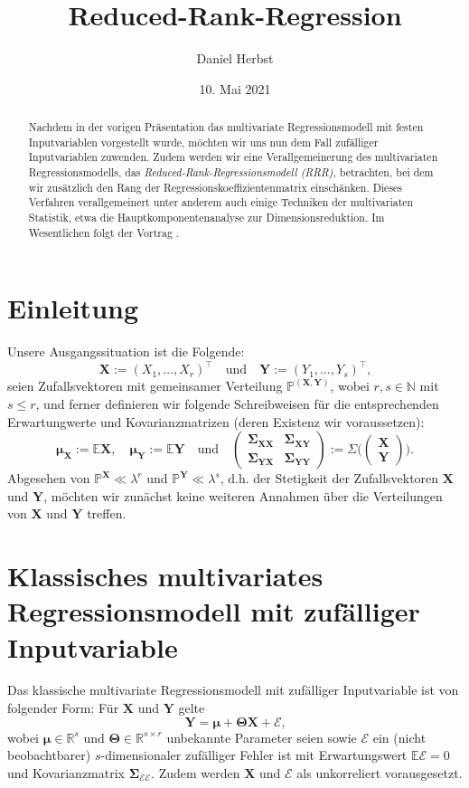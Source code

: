 \documentclass[]{article}
\title{Reduced-Rank-Regression}
\author{Daniel Herbst}
\date{10. Mai 2021}
\newcommand{\Pb}{\mathbb{P}}
\newcommand{\E}{\mathbb{E}}
\newcommand{\R}{\mathbb{R}}
\newcommand{\N}{\mathbb{N}}
\newcommand{\X}{\mathbf{X}}
\newcommand{\Y}{\mathbf{Y}}
\newcommand{\T}{\mathbf{\Theta}}
\newcommand{\muu}{\bm{\mu}}
\newcommand{\Ssigma}{\mathbf{\Sigma}}
\begin{document}
\maketitle

\begin{abstract}
Nachdem in der vorigen Präsentation das multivariate Regressionsmodell mit festen Inputvariablen vorgestellt wurde, möchten wir uns nun dem Fall zufälliger Inputvariablen zuwenden. Zudem werden wir eine Verallgemeinerung des multivariaten Regressionsmodells, das
\textit{Reduced-Rank-Regressionsmodell (RRR)}, betrachten, bei dem wir zusätzlich den Rang der Regressionskoeffizientenmatrix einschänken. Dieses Verfahren verallgemeinert unter anderem auch einige Techniken der multivariaten Statistik, etwa die Hauptkomponentenanalyse zur Dimensionsreduktion. Im Wesentlichen folgt der Vortrag 
\cite[Kapitel 6.3]{Iz08}.
\end{abstract}

\section{Einleitung}
\label{Einleitung}
Unsere Ausgangssituation ist die Folgende:
$$\X := (X_1, \dots, X_r)^\top \quad \text{und} \quad \Y := (Y_1, \dots, Y_s)^\top \text{,}$$
seien Zufallsvektoren mit gemeinsamer Verteilung $\Pb^{(\X, \Y)}$, wobei $r, s \in \N$ mit $s \leq r$,
und ferner definieren wir folgende Schreibweisen für die entsprechenden Erwartungwerte und Kovarianzmatrizen (deren Existenz wir voraussetzen):
$$ \muu_\X := \E\X, \quad \muu_\Y := \E\Y \quad \text{und} \quad \begin{pmatrix}
	\Ssigma_{\X\X} & \Ssigma_{\X\Y} \\
	\Ssigma_{\Y\X} & \Ssigma_{\Y\Y}
\end{pmatrix} := \Sigma \biggl(\begin{pmatrix}
\X \\
\Y
\end{pmatrix}\biggr).$$
Abgesehen von $\Pb^\X \ll \lambda^r$ und $\Pb^\Y \ll \lambda^s$, d.h. der Stetigkeit der Zufallsvektoren $\X$ und $\Y$, möchten wir zunächst keine
weiteren Annahmen über die Verteilungen von $\X$ und $\Y$ treffen.

\section{Klassisches multivariates Regressionsmodell mit zufälliger Inputvariable}

Das klassische multivariate Regressionsmodell mit zufälliger Inputvariable ist von folgender Form: Für $\X$ und $\Y$ gelte
\[ \Y = \muu + \T \X + \mathcal{E} \text{,} \label{eq:2.1} \tag{2.1}\]
wobei $\muu \in \R^s$ und $\T \in \R^{s \times r}$ unbekannte Parameter seien sowie $\mathcal{E}$ ein (nicht beobachtbarer) $s$-dimensionaler zufälliger Fehler ist mit Erwartungswert $\E \mathcal{E} = 0$ und Kovarianzmatrix $\Ssigma_{\mathcal{E} \mathcal{E}}$. Zudem werden $\X$ und
$\mathcal{E}$ als unkorreliert vorausgesetzt.
\\
\end{document}
